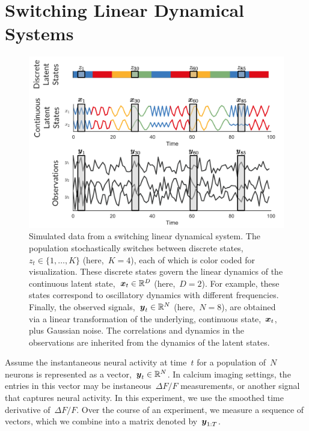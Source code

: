 \documentclass{article}
\begin{document}
\section{Switching Linear Dynamical Systems}
\label{sec:slds}

\begin{figure}[t]
\centering%
\includegraphics[width=5.5in]{slds.png} 
\caption{Simulated data from a switching linear dynamical system.  The
  population stochastically switches between discrete states,~$z_t \in
  \{1,\ldots,K\}$ (here,~$K=4$), each of which is color coded for
  visualization.  These discrete states govern the linear dynamics of
  the continuous latent state,~$\boldsymbol{x}_t \in \mathbb{R}^D$ (here,~$D=2$). For
  example, these states correspond to oscillatory dynamics with
  different frequencies. Finally, the observed signals,~$\boldsymbol{y}_t \in
  \mathbb{R}^N$ (here,~$N=8$), are obtained via a linear transformation of
  the underlying, continuous state,~$\boldsymbol{x}_t$, plus Gaussian noise. The
  correlations and dynamics in the observations are inherited from the
  dynamics of the latent states.}
\label{fig:slds_ex}
\end{figure}

Assume the instantaneous neural activity at time~$t$ for a population
of~$N$ neurons is represented as a vector,~$\boldsymbol{y}_t \in \mathbb{R}^N$. In
calcium imaging settings, the entries in this vector may be
instaneous~$\Delta F/F$ measurements, or another signal that captures
neural activity. In this experiment, we use the smoothed time
derivative of~$\Delta F/F$. Over the course of an experiment, we
measure a sequence of vectors, which we combine into a matrix denoted
by~$\boldsymbol{y}_{1:T}$.
\end{document}
